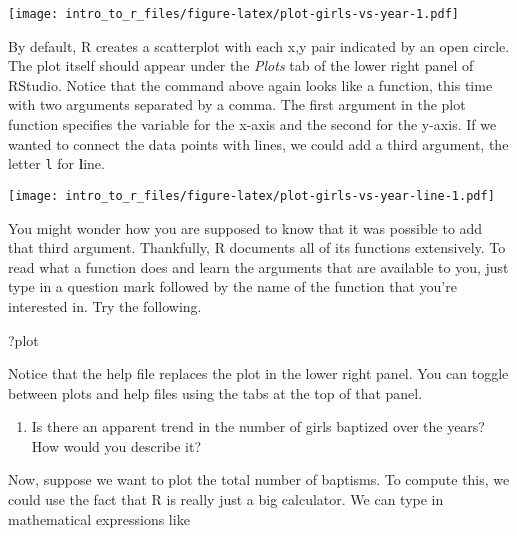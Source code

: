 \documentclass[
]{article}
\newenvironment{Shaded}{\begin{snugshade}}{\end{snugshade}}
\newcommand{\DataTypeTok}[1]{\textcolor[rgb]{0.13,0.29,0.53}{#1}}
\newcommand{\KeywordTok}[1]{\textcolor[rgb]{0.13,0.29,0.53}{\textbf{#1}}}
\newcommand{\NormalTok}[1]{#1}
\newcommand{\OperatorTok}[1]{\textcolor[rgb]{0.81,0.36,0.00}{\textbf{#1}}}
\newcommand{\StringTok}[1]{\textcolor[rgb]{0.31,0.60,0.02}{#1}}
\providecommand{\tightlist}{%
  \setlength{\itemsep}{0pt}\setlength{\parskip}{0pt}}
\begin{document}
\texttt{[image: intro\_to\_r\_files/figure-latex/plot-girls-vs-year-1.pdf]}

By default, R creates a scatterplot with each x,y pair indicated by an
open circle. The plot itself should appear under the \emph{Plots} tab of
the lower right panel of RStudio. Notice that the command above again
looks like a function, this time with two arguments separated by a
comma. The first argument in the plot function specifies the variable
for the x-axis and the second for the y-axis. If we wanted to connect
the data points with lines, we could add a third argument, the letter
\texttt{l} for \textbf{l}ine.

\begin{Shaded}
\end{Shaded}

\texttt{[image: intro\_to\_r\_files/figure-latex/plot-girls-vs-year-line-1.pdf]}

You might wonder how you are supposed to know that it was possible to
add that third argument. Thankfully, R documents all of its functions
extensively. To read what a function does and learn the arguments that
are available to you, just type in a question mark followed by the name
of the function that you're interested in. Try the following.

\begin{Shaded}
\begin{Highlighting}[]
\NormalTok{?plot}
\end{Highlighting}
\end{Shaded}

Notice that the help file replaces the plot in the lower right panel.
You can toggle between plots and help files using the tabs at the top of
that panel.

\begin{enumerate}
\def\labelenumi{\arabic{enumi}.}
\setcounter{enumi}{1}
\tightlist
\item
  Is there an apparent trend in the number of girls baptized over the
  years?\\
  How would you describe it?
\end{enumerate}

Now, suppose we want to plot the total number of baptisms. To compute
this, we could use the fact that R is really just a big calculator. We
can type in mathematical expressions like
\end{document}
